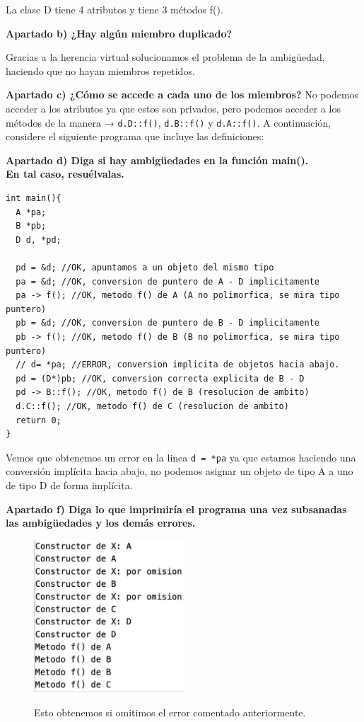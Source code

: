 La clase D tiene 4 atributos y tiene 3 métodos f().

\textbf{\large Apartado b) ¿Hay algún miembro duplicado?}

Gracias a la herencia virtual solucionamos el problema de la ambigüedad, haciendo que no hayan miembros repetidos.

\textbf{\large Apartado c) ¿Cómo se accede a cada uno de los miembros?}
No podemos acceder a los atributos ya que estos son privados, pero podemos acceder a los métodos de la manera → \texttt{d.D::f()}, \texttt{d.B::f()} y \texttt{d.A::f()}.
\newpage
A continuación, considere el siguiente programa que incluye las definiciones:

\textbf{\large Apartado d) Diga si hay ambigüedades en la función main().\\En tal caso, resuélvalas.}
\begin{lstlisting}[frame=single]
int main(){
  A *pa;
  B *pb;
  D d, *pd;

  pd = &d; //OK, apuntamos a un objeto del mismo tipo
  pa = &d; //OK, conversion de puntero de A - D implicitamente
  pa -> f(); //OK, metodo f() de A (A no polimorfica, se mira tipo puntero)
  pb = &d; //OK, conversion de puntero de B - D implicitamente
  pb -> f(); //OK, metodo f() de B (B no polimorfica, se mira tipo puntero)
  // d= *pa; //ERROR, conversion implicita de objetos hacia abajo.
  pd = (D*)pb; //OK, conversion correcta explicita de B - D
  pd -> B::f(); //OK, metodo f() de B (resolucion de ambito)
  d.C::f(); //OK, metodo f() de C (resolucion de ambito)
  return 0;
}
\end{lstlisting}

Vemos que obtenemos un error en la linea \texttt{d = *pa} ya que estamos haciendo una conversión implícita hacia abajo, no podemos asignar un objeto de tipo A a uno de tipo D de forma implícita.

\textbf{\large Apartado f) Diga lo que imprimiría el programa una vez subsanadas las ambigüedades y los demás errores.}
\begin{figure}[h]
  \begin{center}
    \includegraphics[width=0.5\textwidth]{assets/Mayo2008_2_1.jpeg}
  \end{center}
  Esto obtenemos si omitimos el error comentado anteriormente.
\end{figure}
